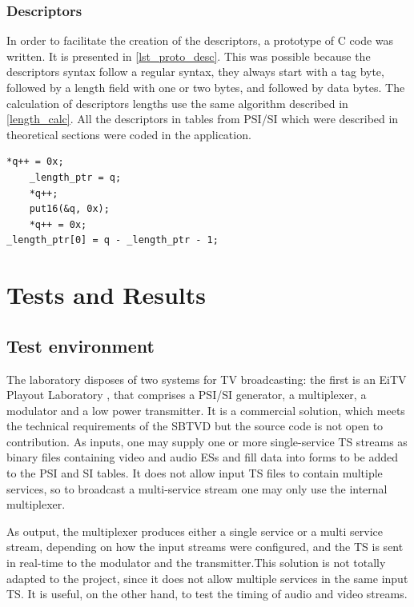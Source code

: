 \documentclass[
	12pt,				%
	openright,			%
	twoside,			%
	a4paper,			%
	brazil,
	french,				%
	english
	]{abntex2}
\begin{document}
\subsection{Descriptors}

In order to facilitate the creation of the descriptors, a prototype of C code was written. It is presented in \autoref{lst_proto_desc}. This was possible because the descriptors syntax follow a regular syntax, they always start with a tag byte, followed by a length field with one or two bytes, and followed by data bytes. The calculation of descriptors lengths use the same algorithm described in \autoref{length_calc}. All the descriptors in tables from PSI/SI which were described in theoretical sections were coded in the application.

\begin{minipage}{\linewidth}
\begin{lstlisting}[caption={Descriptors prototype.}, label={lst_proto_desc}]
	*q++ = 0x;
	_length_ptr = q;
	*q++;
	put16(&q, 0x);
	*q++ = 0x; 
_length_ptr[0] = q - _length_ptr - 1;
\end{lstlisting}
\end{minipage}

\chapter{Tests and Results}
%
\section{Test environment}

The laboratory disposes of two systems for TV broadcasting: the first is an EiTV Playout Laboratory \cite{eitv}, that comprises a PSI/SI generator, a multiplexer, a modulator and a low power transmitter. It is a commercial solution, which meets the technical requirements of the SBTVD but the source code is not open to contribution. As inputs, one may supply one or more single-service TS streams as binary files containing video and audio ESs and fill data into forms to be added to the PSI and SI tables. It does not allow input TS files to contain multiple services, so to broadcast a multi-service stream one may only use the internal multiplexer.

As output, the multiplexer produces either a single service or a multi service stream, depending on how the input streams were configured, and the TS is sent in real-time to the modulator and the transmitter.This solution is not totally adapted to the project, since it does not allow multiple services in the same input TS. It is useful, on the other hand, to test the timing of audio and video streams.
\end{document}

